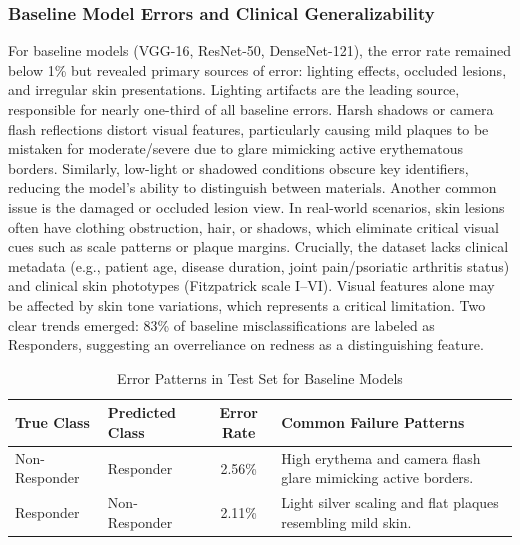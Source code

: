\documentclass[11pt,journal,compsoc]{IEEEtran}
\begin{document}
\subsubsection{Baseline Model Errors and Clinical Generalizability}
For baseline models (VGG-16, ResNet-50, DenseNet-121), the error rate remained below 1\% but revealed primary sources of error: lighting effects, occluded lesions, and irregular skin presentations. Lighting artifacts are the leading source, responsible for nearly one-third of all baseline errors. Harsh shadows or camera flash reflections distort visual features, particularly causing mild plaques to be mistaken for moderate/severe due to glare mimicking active erythematous borders. Similarly, low-light or shadowed conditions obscure key identifiers, reducing the model's ability to distinguish between materials. Another common issue is the damaged or occluded lesion view. In real-world scenarios, skin lesions often have clothing obstruction, hair, or shadows, which eliminate critical visual cues such as scale patterns or plaque margins. Crucially, the dataset lacks clinical metadata (e.g., patient age, disease duration, joint pain/psoriatic arthritis status) and clinical skin phototypes (Fitzpatrick scale I--VI). Visual features alone may be affected by skin tone variations, which represents a critical limitation. Two clear trends emerged: 83\% of baseline misclassifications are labeled as Responders, suggesting an overreliance on redness as a distinguishing feature.

\begin{table}[t]
\centering
\caption{Error Patterns in Test Set for Baseline Models}
\label{tab:error_patterns}
\begin{tabular}{llcl}
\toprule
True Class & Predicted Class & Error Rate & Common Failure Patterns \\
\midrule
Non-Responder & Responder & 2.56\% & High erythema and camera flash glare mimicking active borders. \\
Responder & Non-Responder & 2.11\% & Light silver scaling and flat plaques resembling mild skin. \\
\bottomrule
\end{tabular}
\end{table}
\end{document}
